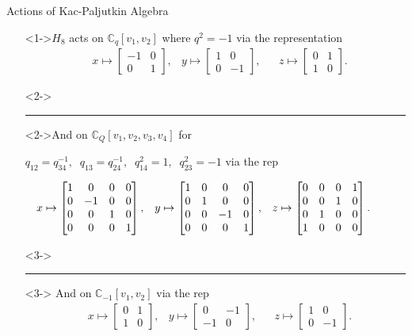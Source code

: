 \documentclass{beamer}
\newcommand\1{_{(1)}}
\newcommand\2{_{(2)}}
\begin{document}
\begin{frame}{Actions of Kac-Paljutkin Algebra}

\begin{itemize}

    \item[]<1->$H_8$ acts on $\mathbb{C}_q[v_1,v_2]$ where $q^2=-1$ via the representation
    \begin{align*}
   & x\mapsto \begin{bmatrix}-1 & 0\\0 & 1\end{bmatrix}, & y\mapsto \begin{bmatrix} 1 & 0\\ 0 & -1\end{bmatrix}, & & z\mapsto\begin{bmatrix} 0 & 1\\ 1 & 0\end{bmatrix}.
    \end{align*}
    \item[]<2-> \hrule
    \item[]<2->And on $\mathbb{C}_Q[v_1,v_2,v_3,v_4]$ for 
   
    \vspace{1ex}
    $q_{12}=q_{34}^{-1},\;\;q_{13}=q_{24}^{-1},\;\;q_{14}^2=1,\;\;q_{23}^2=-1$ via the rep


    \begin{align*}
     \hspace{-5ex} & x\mapsto \begin{bmatrix} 1&0&0&0\\0&-1&0&0\\0&0&1&0\\0&0&0&1\end{bmatrix}, & y\mapsto \begin{bmatrix} 1&0&0&0\\0&1&0&0\\0&0&-1&0\\0&0&0&1\end{bmatrix}, & & z\mapsto\begin{bmatrix}0&0&0&1\\0&0&1&0\\0&1&0&0\\1&0&0&0\end{bmatrix}.
    \end{align*}
    
    \item[]<3->\hrule
    \item[]<3-> And on $\mathbb{C}_{-1}[v_1,v_2]$ via the rep
    \begin{align*}
   & x\mapsto \begin{bmatrix}0&1\\1&0\end{bmatrix}, & y\mapsto\begin{bmatrix}0&-1\\-1&0\end{bmatrix}, & & z\mapsto\begin{bmatrix}1&0\\0&-1\end{bmatrix}.
    \end{align*}
\end{itemize}
\end{frame}
\end{document}
